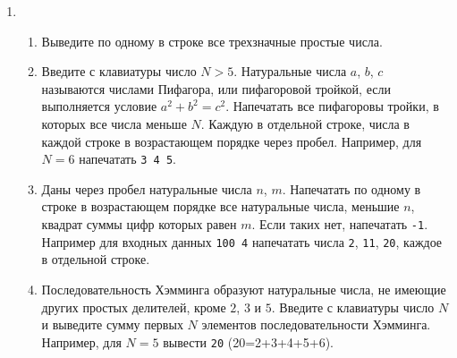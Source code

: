 \documentclass{article}
\begin{document}
\begin{enumerate}[label={}, leftmargin=0pt, itemindent=0pt]
\begin{enumerate}[label=\arabic{enumi}.\arabic*.]
\end{enumerate}
\hrulefill

\item
\begin{enumerate}[label=\arabic{enumi}.\arabic*.]
\item 
Выведите по одному в строке все трехзначные простые числа.
\item 
Введите с клавиатуры число $N>5$. Натуральные числа $a$, $b$, $c$ называются числами Пифагора, или пифагоровой тройкой, если выполняется условие $a^2+b^2=c^2$. Напечатать все пифагоровы тройки, в которых все числа меньше $N$. Каждую в отдельной строке, числа в каждой строке в возрастающем порядке через пробел. Например, для $N=6$ напечатать \texttt{3 4 5}.
\item 
Даны через пробел натуральные числа $n$, $m$. Напечатать по одному в строке в возрастающем порядке все натуральные числа, меньшие $n$, квадрат суммы цифр которых равен $m$.
Если таких нет, напечатать \texttt{-1}. Например для входных данных \texttt{100 4} напечатать числа \texttt{2}, \texttt{11}, \texttt{20}, каждое в отдельной строке.
\item
Последовательность Хэмминга образуют натуральные числа, не имеющие других простых делителей, кроме $2$, $3$ и $5$. Введите с клавиатуры число $N$ и выведите сумму первых $N$ элементов последовательности Хэмминга. 
Например, для $N=5$ вывести \texttt{20} (20=2+3+4+5+6).
\end{enumerate}



\end{enumerate}
\end{document}
